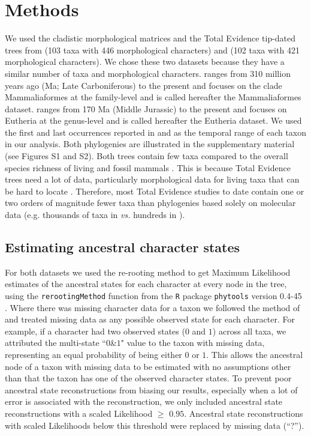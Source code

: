 \documentclass[10pt,letterpaper]{article}
\begin{document}
\section*{Methods}
We used the cladistic morphological matrices and the Total Evidence tip-dated trees \cite{ronquista2012} from \cite{Slater2012MEE} (103 taxa with 446 morphological characters) and \cite{beckancient2014} (102 taxa with 421 morphological characters).
We chose these two datasets because they have a similar number of taxa and morphological characters.
\cite{Slater2012MEE} ranges from 310 million years ago (Ma; Late Carboniferous) to the present and focuses on the clade Mammaliaformes at the family-level and is called hereafter the Mammaliaformes dataset.
\cite{beckancient2014} ranges from 170 Ma (Middle Jurassic) to the present and focuses on Eutheria at the genus-level and is called hereafter the Eutheria dataset.
We used the first and last occurrences reported in \cite{Slater2012MEE} and \cite{beckancient2014} as the temporal range of each taxon in our analysis.
Both phylogenies are illustrated in the supplementary material (see Figures S1 and S2).
Both trees contain few taxa compared to the overall species richness of living and fossil mammals \cite{bininda-emondsthe2007,archibald2011extinction}.
This is because Total Evidence trees need a lot of data, particularly morphological data for living taxa that can be hard to locate \cite{GuillermeCooper}.
Therefore, most Total Evidence studies to date contain one or two orders of magnitude fewer taxa than phylogenies based solely on molecular data (e.g. thousands of taxa in \cite{bininda-emondsthe2007,meredithimpacts2011} \textit{vs.} hundreds in \cite{ronquista2012,Slater2012MEE,Wood01032013,beckancient2014}).

\subsection*{Estimating ancestral character states}
For both datasets we used the re-rooting method \cite{Yang01121995,Garland2000} to get Maximum Likelihood estimates of the ancestral states for each character at every node in the tree, using the \texttt{rerootingMethod} function from the \texttt{R} package \texttt{phytools} version 0.4-45 \cite{phytools,R}.
Where there was missing character data for a taxon we followed the method of \cite{Claddis} and treated missing data as any possible observed state for each character.
For example, if a character had two observed states ($0$ and $1$) across all taxa, we attributed the multi-state ``$0$\&$1$" value to the taxon with missing data, representing an equal probability of being either $0$ or $1$.
This allows the ancestral node of a taxon with missing data to be estimated with no assumptions other than that the taxon has one of the observed character states.
To prevent poor ancestral state reconstructions from biasing our results, especially when a lot of error is associated with the reconstruction, we only included ancestral state reconstructions with a scaled Likelihood $\geq$ $0.95$.
Ancestral state reconstructions with scaled Likelihoods below this threshold were replaced by missing data (``?'').
\end{document}
